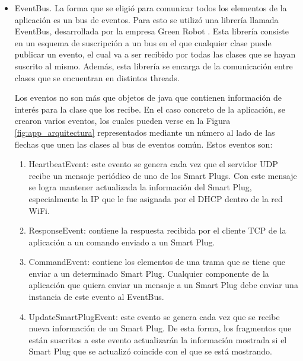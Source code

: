 \begin{itemize}
\item EventBus. La forma que se eligió para comunicar todos los elementos de la aplicación es un bus de eventos. Para esto se utilizó una librería llamada EventBus, desarrollada por la empresa Green Robot \citep{eventbus_web}. Esta librería consiste en un esquema de suscripción a un bus en el que cualquier clase puede publicar un evento, el cual va a ser recibido por todas las clases que se hayan suscrito al mismo. Además, esta librería se encarga de la comunicación entre clases que se encuentran en distintos threads.

Los eventos no son más que objetos de java que contienen información de interés para la clase que los recibe. En el caso concreto de la aplicación, se crearon varios eventos, los cuales pueden verse en la Figura \ref{fig:app_arquitectura} representados mediante un número al lado de las flechas que unen las clases al bus de eventos común. Estos eventos son:


\begin{enumerate}
\item HeartbeatEvent: este evento se genera cada vez que el servidor UDP recibe un mensaje periódico de uno de los Smart Plugs. Con este mensaje se logra mantener actualizada la información del Smart Plug, especialmente la IP que le fue asignada por el DHCP dentro de la red WiFi.
\item ResponseEvent: contiene la respuesta recibida por el cliente TCP de la aplicación a un comando enviado a un Smart Plug.
\item CommandEvent: contiene los elementos de una trama que se tiene que enviar a un determinado Smart Plug. Cualquier componente de la aplicación que quiera enviar un mensaje a un Smart Plug debe enviar una instancia de este evento al EventBus.
\item UpdateSmartPlugEvent: este evento se genera cada vez que se recibe nueva información de un Smart Plug. De esta forma, los fragmentos que están suscritos a este evento actualizarán la información mostrada si el Smart Plug que se actualizó coincide con el que se está mostrando. 


\end{enumerate}
\end{itemize}

